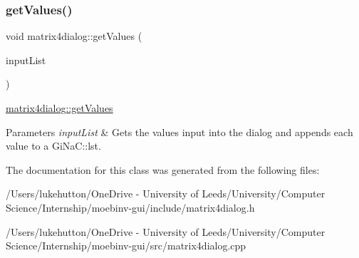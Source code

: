 \subsubsection{\texorpdfstring{get\+Values()}{getValues()}}
{\footnotesize\ttfamily void matrix4dialog\+::get\+Values (\begin{DoxyParamCaption}\item[{Gi\+Na\+C\+::lst $\ast$}]{input\+List }\end{DoxyParamCaption})}



\mbox{\hyperlink{classmatrix4dialog_a4826be428cb3f2d79905aee086cc296d}{matrix4dialog\+::get\+Values}} 


\begin{DoxyParams}{Parameters}
{\em input\+List} & Gets the values input into the dialog and appends each value to a Gi\+Na\+C\+::lst. \\
\hline
\end{DoxyParams}


The documentation for this class was generated from the following files\+:\begin{DoxyCompactItemize}
\item 
/\+Users/lukehutton/\+One\+Drive -\/ University of Leeds/\+University/\+Computer Science/\+Internship/moebinv-\/gui/include/matrix4dialog.\+h\item 
/\+Users/lukehutton/\+One\+Drive -\/ University of Leeds/\+University/\+Computer Science/\+Internship/moebinv-\/gui/src/matrix4dialog.\+cpp\end{DoxyCompactItemize}

